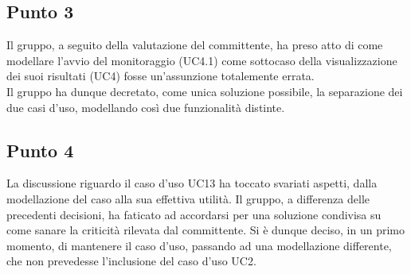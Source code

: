 \subsection{Punto 3}
Il gruppo, a seguito della valutazione del committente, ha preso atto di come modellare l'avvio del monitoraggio (UC4.1) come sottocaso della visualizzazione dei suoi risultati (UC4) fosse un'assunzione totalemente errata.\\
Il gruppo ha dunque decretato, come unica soluzione possibile, la separazione dei due casi d'uso, modellando così due funzionalità distinte.

\subsection{Punto 4}
La discussione riguardo il caso d'uso UC13 ha toccato svariati aspetti, dalla modellazione del caso alla sua effettiva utilità. Il gruppo, a differenza delle precedenti decisioni, ha faticato ad accordarsi per una soluzione condivisa su come sanare la criticità rilevata dal committente. Si è dunque deciso, in un primo momento, di mantenere il caso d'uso, passando ad una modellazione differente, che non prevedesse l'inclusione del caso d'uso UC2.

